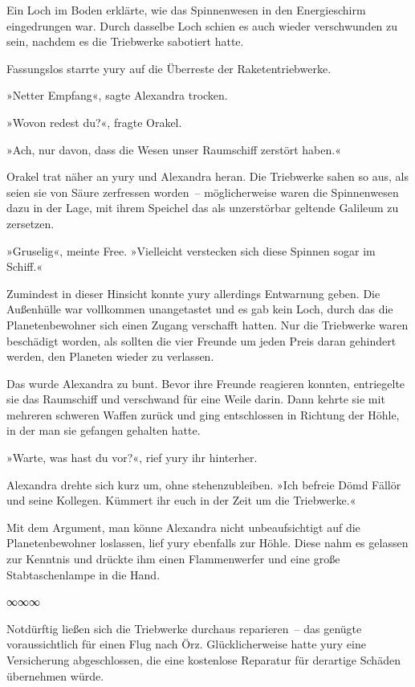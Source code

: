 Ein Loch im Boden erklärte, wie das Spinnenwesen in den Energieschirm eingedrungen war. Durch dasselbe Loch schien es auch wieder verschwunden zu sein, nachdem es die Triebwerke sabotiert hatte.

Fassungslos starrte yury auf die Überreste der Raketentriebwerke.

»Netter Empfang«, sagte Alexandra trocken.

»Wovon redest du?«, fragte Orakel.

»Ach, nur davon, dass die Wesen unser Raumschiff zerstört haben.«

Orakel trat näher an yury und Alexandra heran. Die Triebwerke sahen so aus, als seien sie von Säure zerfressen worden~– möglicherweise waren die Spinnenwesen dazu in der Lage, mit ihrem Speichel das als unzerstörbar geltende Galileum zu zersetzen.

»Gruselig«, meinte Free. »Vielleicht verstecken sich diese Spinnen sogar im Schiff.«

Zumindest in dieser Hinsicht konnte yury allerdings Entwarnung geben. Die Außenhülle war vollkommen unangetastet und es gab kein Loch, durch das die Planetenbewohner sich einen Zugang verschafft hatten. Nur die Triebwerke waren beschädigt worden, als sollten die vier Freunde um jeden Preis daran gehindert werden, den Planeten wieder zu verlassen.

Das wurde Alexandra zu bunt. Bevor ihre Freunde reagieren konnten, entriegelte sie das Raumschiff und verschwand für eine Weile darin. Dann kehrte sie mit mehreren schweren Waffen zurück und ging entschlossen in Richtung der Höhle, in der man sie gefangen gehalten hatte.

»Warte, was hast du vor?«, rief yury ihr hinterher.

Alexandra drehte sich kurz um, ohne stehenzubleiben. »Ich befreie Dömd Fällör und seine Kollegen. Kümmert ihr euch in der Zeit um die Triebwerke.«

Mit dem Argument, man könne Alexandra nicht unbeaufsichtigt auf die Planetenbewohner loslassen, lief yury ebenfalls zur Höhle. Diese nahm es gelassen zur Kenntnis und drückte ihm einen Flammenwerfer und eine große Stabtaschenlampe in die Hand.

\begin{center}
    ∞∞∞
\end{center}

Notdürftig ließen sich die Triebwerke durchaus reparieren~– das genügte voraussichtlich für einen Flug nach Örz. Glücklicherweise hatte yury eine Versicherung abgeschlossen, die eine kostenlose Reparatur für derartige Schäden übernehmen würde.

